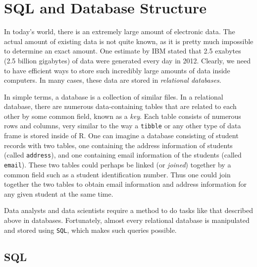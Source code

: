 \documentclass[]{krantz}
\begin{document}
\hypertarget{sql-and-database-structure}{%
\section{SQL and Database Structure}\label{sql-and-database-structure}}

In today's world, there is an extremely large amount of electronic data. The actual amount of existing data is not quite known, as it is pretty much impossible to determine an exact amount. One estimate by IBM stated that 2.5 exabytes (2.5 billion gigabytes) of data were generated every day in 2012. Clearly, we need to have efficient ways to store such incredibly large amounts of data inside computers. In many cases, these data are stored in \emph{relational databases}.

In simple terms, a database is a collection of similar files. In a relational database, there are numerous data-containing tables that are related to each other by some common field, known as a \emph{key}. Each table consists of numerous rows and columns, very similar to the way a \texttt{tibble} or any other type of data frame is stored inside of R. One can imagine a database consisting of student records with two tables, one containing the address information of students (called \texttt{address}), and one containing email information of the students (called \texttt{email}). These two tables could perhaps be linked (or \emph{joined}) together by a common field such as a student identification number. Thus one could join together the two tables to obtain email information and address information for any given student at the same time.

Data analysts and data scientists require a method to do tasks like that described above in databases. Fortunately, almost every relational database is manipulated and stored using \texttt{SQL}, which makes such queries possible.

\hypertarget{sql}{%
\subsection{SQL}\label{sql}}
\end{document}
